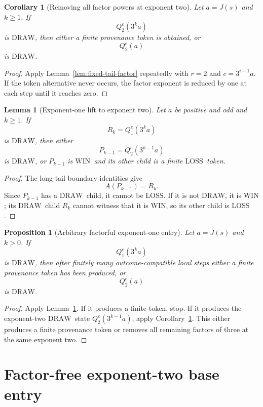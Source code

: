 \documentclass[11pt]{article}
\newtheorem{lemma}[theorem]{Lemma}
\newtheorem{proposition}[theorem]{Proposition}
\newtheorem{corollary}[theorem]{Corollary}
\newcommand{\WIN}{\ensuremath{\mathrm{WIN}}}
\newcommand{\LOSS}{\ensuremath{\mathrm{LOSS}}}
\newcommand{\DRAW}{\ensuremath{\mathrm{DRAW}}}
\begin{document}
\begin{corollary}[Removing all factor powers at exponent two]\label{cor:remove-to-base}
Let $a=J(s)$ and $k\ge1$. If
\[
  Q_2^e(3^ka)
\]
is \DRAW, then either a finite provenance token is obtained, or
\[
  Q_2^e(a)
\]
is \DRAW.
\end{corollary}

\begin{proof}
Apply Lemma~\ref{lem:fixed-tail-factor} repeatedly with $r=2$ and
$c=3^{i-1}a$. If the token alternative never occurs, the factor exponent is
reduced by one at each step until it reaches zero.
\end{proof}

\begin{lemma}[Exponent-one lift to exponent two]\label{lem:exp-one-lift}
Let $a$ be positive and odd and $k\ge1$. If
\[
  R_k=Q_1^e(3^ka)
\]
is \DRAW, then either
\[
  P_{k-1}=Q_2^e(3^{k-1}a)
\]
is \DRAW, or $P_{k-1}$ is \WIN\ and its other child is a finite \LOSS\ token.
\end{lemma}

\begin{proof}
The long-tail boundary identities give
\[
  A(P_{k-1})=R_k.
\]
Since $P_{k-1}$ has a \DRAW\ child, it cannot be \LOSS. If it is not \DRAW,
it is \WIN; its \DRAW\ child $R_k$ cannot witness that it is \WIN, so its other
child is \LOSS.
\end{proof}

\begin{proposition}[Arbitrary factorful exponent-one entry]\label{prop:factorful-entry}
Let $a=J(s)$ and $k>0$. If
\[
  Q_1^e(3^ka)
\]
is \DRAW, then after finitely many outcome-compatible local steps either a
finite provenance token has been produced, or
\[
  Q_2^e(a)
\]
is \DRAW.
\end{proposition}

\begin{proof}
Apply Lemma~\ref{lem:exp-one-lift}. If it produces a finite token, stop. If it
produces the exponent-two \DRAW\ state $Q_2^e(3^{k-1}a)$, apply
Corollary~\ref{cor:remove-to-base}. This either produces a finite provenance
token or removes all remaining factors of three at the same exponent two.
\end{proof}

\section{Factor-free exponent-two base entry}
\end{document}
